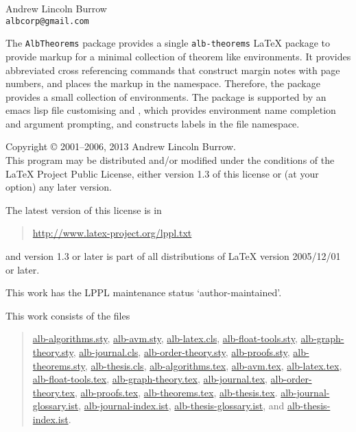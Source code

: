 \documentclass[11pt,a4paper,oneside,titlepage]{alb-latex}
\begin{document}


\begin{albTitlePage}


  Andrew Lincoln Burrow\\
  \texttt{albcorp@gmail.com}



  The \texttt{AlbTheorems} package provides a single
  \texttt{alb-theorems} \LaTeX{} package to provide markup for a minimal
  collection of theorem like environments.  It provides abbreviated
  cross referencing commands that construct margin notes with page
  numbers, and places the markup in the \albLogo{} namespace.
  Therefore, the package provides a small collection of environments.
  The package is supported by an emacs lisp file customising \AUCTeX{}
  and \RefTeX{}, which provides environment name completion and argument
  prompting, and constructs labels in the file namespace.



  Copyright \copyright{} 2001--2006, 2013 Andrew Lincoln Burrow.\\
  This program may be distributed and/or modified under the conditions
  of the \LaTeX{} Project Public License, either version 1.3 of this
  license or (at your option) any later version.

  \medskip{}

  The latest version of this license is in
  \begin{quote}
    \url{http://www.latex-project.org/lppl.txt}
  \end{quote}
  and version 1.3 or later is part of all distributions of LaTeX version
  2005/12/01 or later.

  \medskip{}

  This work has the LPPL maintenance status `author-maintained'.

  \medskip{}

  This work consists of the files
  \begin{quote}
    \begin{flushleft}
      \url{alb-algorithms.sty}, \url{alb-avm.sty}, \url{alb-latex.cls},
      \url{alb-float-tools.sty}, \url{alb-graph-theory.sty},
      \url{alb-journal.cls}, \url{alb-order-theory.sty},
      \url{alb-proofs.sty}, \url{alb-theorems.sty},
      \url{alb-thesis.cls}, \url{alb-algorithms.tex}, \url{alb-avm.tex},
      \url{alb-latex.tex}, \url{alb-float-tools.tex},
      \url{alb-graph-theory.tex}, \url{alb-journal.tex},
      \url{alb-order-theory.tex}, \url{alb-proofs.tex},
      \url{alb-theorems.tex}, \url{alb-thesis.tex}.
      \url{alb-journal-glossary.ist}, \url{alb-journal-index.ist},
      \url{alb-thesis-glossary.ist}, and \url{alb-thesis-index.ist}.
    \end{flushleft}
  \end{quote}



\end{albTitlePage}
\end{document}
